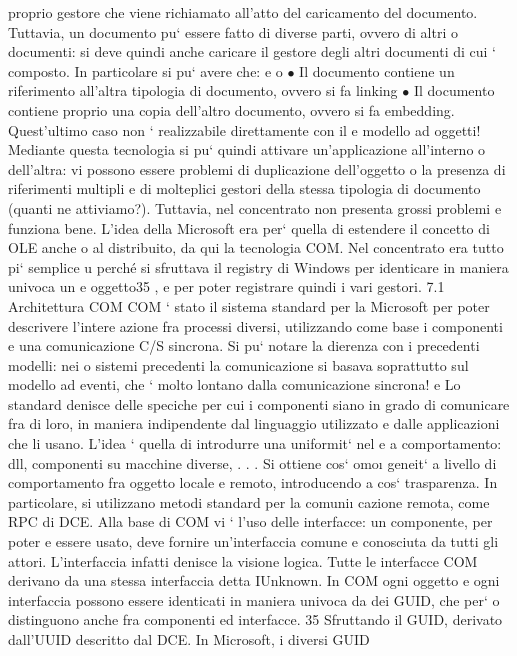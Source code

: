 \documentclass[a4paper,12pt]{article}
\begin{document}
proprio gestore che viene richiamato all'atto del caricamento del documento.
Tuttavia, un documento pu` essere fatto di diverse parti, ovvero di altri
o
documenti: si deve quindi anche caricare il gestore degli altri documenti di cui
` composto. In particolare si pu` avere che:
e
o
$\bullet$ Il documento contiene un riferimento all'altra tipologia di documento,
ovvero si fa linking
$\bullet$ Il documento contiene proprio una copia dell'altro documento, ovvero si
fa embedding. Quest'ultimo caso non ` realizzabile direttamente con il
e
modello ad oggetti!
Mediante questa tecnologia si pu` quindi attivare un'applicazione all'interno
o
dell'altra: vi possono essere problemi di duplicazione dell'oggetto o la presenza
di riferimenti multipli e di molteplici gestori della stessa tipologia di documento
(quanti ne attiviamo?). Tuttavia, nel concentrato non presenta grossi problemi
e funziona bene.
L'idea della Microsoft era per` quella di estendere il concetto di OLE anche
o
al distribuito, da qui la tecnologia COM. Nel concentrato era tutto pi` semplice
u
perché si sfruttava il registry di Windows per identicare in maniera univoca un
e
oggetto35 , e per poter registrare quindi i vari gestori.
7.1
Architettura COM
COM ` stato il sistema standard per la Microsoft per poter descrivere l'intere
azione fra processi diversi, utilizzando come base i componenti e una comunicazione C/S sincrona. Si pu` notare la
dierenza con i precedenti modelli: nei
o
sistemi precedenti la comunicazione si basava soprattutto sul modello ad eventi,
che ` molto lontano dalla comunicazione sincrona!
e
Lo standard denisce delle speciche per cui i componenti siano in grado
di comunicare fra di loro, in maniera indipendente dal linguaggio utilizzato e
dalle applicazioni che li usano. L'idea ` quella di introdurre una uniformit` nel
e
a
comportamento: dll, componenti su macchine diverse, . . . Si ottiene cos` omo\i{}
geneit` a livello di comportamento fra oggetto locale e remoto, introducendo
a
cos` trasparenza. In particolare, si utilizzano metodi standard per la comuni\i{}
cazione remota, come RPC di DCE.
Alla base di COM vi ` l'uso delle interfacce: un componente, per poter
e
essere usato, deve fornire un'interfaccia comune e conosciuta da tutti gli attori. L'interfaccia infatti denisce la
visione logica. Tutte le interfacce COM
derivano da una stessa interfaccia detta IUnknown. In COM ogni oggetto e ogni
interfaccia possono essere identicati in maniera univoca da dei GUID, che per`
o
distinguono anche fra componenti ed interfacce.
35 Sfruttando il GUID, derivato dall'UUID descritto dal DCE. In Microsoft, i diversi GUID
\end{document}
